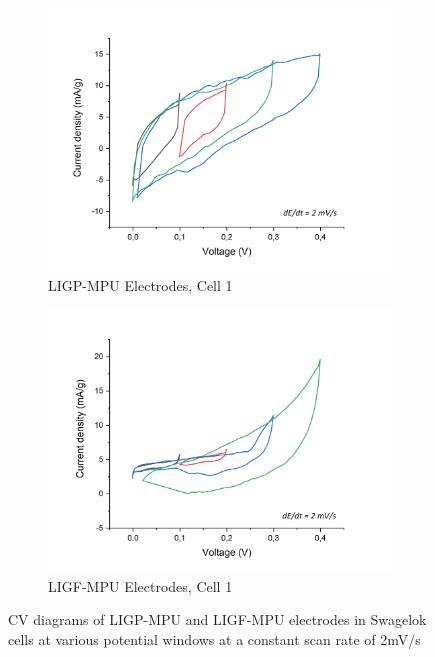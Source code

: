 \begin{figure}[H]
\begin{subfigure}{0.49\textwidth}
\includegraphics[width=1\textwidth]{Figures/Results/Electrochemistry/LIGP-MPU-NaNO3-Swagelok/Cell1/CV-different-windows.jpg} 
\captionsetup{width=0.9\linewidth}
\caption{LIGP-MPU Electrodes, Cell 1}
\label{fig:LIGP-MPU-cell1}
\end{subfigure}
\begin{subfigure}{0.49\textwidth}
\includegraphics[width=1\textwidth]{Figures/Results/Electrochemistry/LIGF-MPU-NaNO3-Swagelok/Cell1/CV-all-voltages.jpg}
\captionsetup{width=0.9\linewidth}
\caption{LIGF-MPU Electrodes, Cell 1}
\label{fig:LIGF-MPU-cell1}
\end{subfigure}
\medskip
\caption{CV diagrams of LIGP-MPU and LIGF-MPU electrodes in Swagelok cells at various potential windows at a constant scan rate of 2\:mV/s}
\label{fig:LIG-MPU_CV}
\end{figure}

